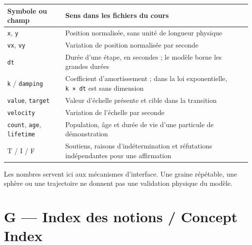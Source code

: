 \documentclass[
  canadien,
  11pt,
  a4paper,
]{report}
\newcounter{none} %
\begin{document}
{\def\LTcaptype{none} %
\begin{longtable}[]{@{}
  >{\raggedright\arraybackslash}p{}
  >{\raggedright\arraybackslash}p{}@{}}
\toprule\noalign{}
\begin{minipage}[b]{\linewidth}\raggedright
Symbole ou champ
\end{minipage} & \begin{minipage}[b]{\linewidth}\raggedright
Sens dans les fichiers du cours
\end{minipage} \\
\midrule\noalign{}
\endhead
\bottomrule\noalign{}
\endlastfoot
\texttt{x}, \texttt{y} & Position normalisée, sans unité de longueur
physique \\
\texttt{vx}, \texttt{vy} & Variation de position normalisée par
seconde \\
\texttt{dt} & Durée d'une étape, en secondes ; le modèle borne les
grandes durées \\
\texttt{k} / \texttt{damping} & Coefficient d'amortissement ; dans la
loi exponentielle, \texttt{k\ ×\ dt} est sans dimension \\
\texttt{value}, \texttt{target} & Valeur d'échelle présente et cible
dans la transition \\
\texttt{velocity} & Variation de l'échelle par seconde \\
\texttt{count}, \texttt{age}, \texttt{lifetime} & Population, âge et
durée de vie d'une particule de démonstration \\
T / I / F & Soutiens, raisons d'indétermination et réfutations
indépendantes pour une affirmation \\
\end{longtable}
}

Les nombres servent ici aux mécanismes d'interface. Une graine
répétable, une sphère ou une trajectoire ne donnent pas une validation
physique du modèle.

\section{G --- Index des notions / Concept
Index}\label{g-index-des-notions-concept-index}
\end{document}
